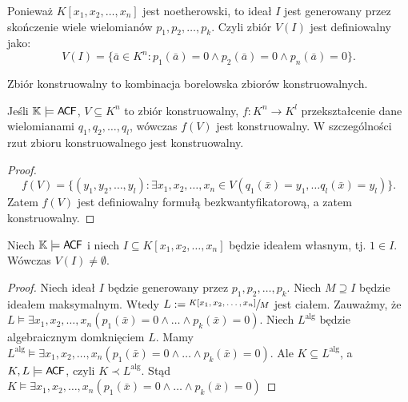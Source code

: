 \documentclass{article}
\begin{document}
\begin{obs}
	Ponieważ $K[x_1, x_2, \ldots, x_n ]$ jest noetherowski, to ideał $I$ jest generowany przez skończenie wiele wielomianów $p_1, p_2, \ldots, p_k$.
	Czyli zbiór $V(I)$ jest definiowalny jako:
	$$V(I) = \{ \bar{a} \in K^n \colon p_1(\bar{a}) = 0 \wedge p_2(\bar{a}) = 0 \wedge p_n(\bar{a})=0 \}.$$
\end{obs}

\begin{df}
	 Zbiór konstruowalny to kombinacja borelowska zbiorów konstruowalnych.
\end{df}

\begin{tw}[Chevalley'a]
	 Jeśli $\mathbb{K} \models \mathsf{A \mkern-2.0mu C \mkern-1.1mu F}$, $V \subseteq K^n$ to zbiór konstruowalny, $f \colon K^n \to K^l$ przekształcenie dane wielomianami $q_1, q_2, \ldots, q_l$,
	 wówczas $f(V)$ jest konstruowalny.
	 W szczególności rzut zbioru konstruowalnego jest konstruowalny.
\end{tw}
\begin{proof}
	\[
		f(V) = \{ (y_1, y_2, \ldots, y_l ) \colon \exists x_1, x_2, \ldots, x_n \in V (q_1(\bar{x}) = y_1, \ldots q_l(\bar{x}) = y_l)  \}.
	\]
	Zatem $ f(V) $ jest definiowalny formułą bezkwantyfikatorową, a zatem konstruowalny.
\end{proof}

\begin{tw}
	Niech $  \mathbb{K} \models \mathsf{A \mkern-2.0mu C \mkern-1.1mu F} $ i niech $  I \subseteq K[x_1, x_2, \ldots, x_n ] $ będzie ideałem własnym, tj. $  1 \in I $.
	Wówczas $  V(I) \neq \emptyset $.
\end{tw}
\begin{proof}
	 Niech ideał $I$ będzie generowany przez $  p_1, p_2, \ldots, p_k  $.
	 Niech $  M \supseteq I$ będzie ideałem maksymalnym.
	 Wtedy $L :=  \sfrac{K[x_1, x_2, \ldots, x_n ]}{M} $ jest ciałem.
	 Zauważmy, że $  L \models \exists x_1, x_2, \ldots, x_n (p_1(\bar{x}) = 0 \wedge \ldots \wedge p_k(\bar{x}) = 0) $.
	 Niech $ L^{\text{alg}} $ będzie algebraicznym domknięciem $ L $.
	Mamy $  L^{\text{alg}} \models \exists x_1, x_2, \ldots, x_n (p_1(\bar{x}) = 0 \wedge \ldots \wedge p_k(\bar{x}) = 0) $.
	Ale $  K \subseteq L^{\text{alg}} $, a $ K , L \models \mathsf{A \mkern-2.0mu C \mkern-1.1mu F} $, czyli $ K \prec L^{\text{alg}} $.
	Stąd $  K \models \exists x_1, x_2, \ldots, x_n (p_1(\bar{x}) = 0 \wedge \ldots \wedge p_k(\bar{x}) = 0) $
\end{proof}

\end{document}
